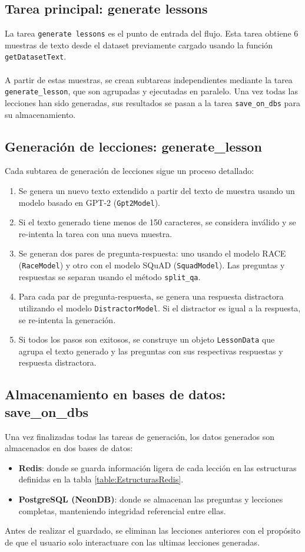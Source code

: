 \subsection{Tarea principal: generate lessons}
La tarea \texttt{generate lessons} es el punto de entrada del flujo. Esta tarea obtiene 6 muestras de texto desde el dataset previamente cargado usando la función \texttt{getDatasetText}.
\\
\\
A partir de estas muestras, se crean subtareas independientes mediante la tarea \texttt{generate\_lesson}, que son agrupadas y ejecutadas en paralelo. Una vez todas las lecciones han sido generadas, sus resultados se pasan a la tarea \texttt{save\_on\_dbs} para su almacenamiento.

\subsection{Generación de lecciones: generate\_lesson}
Cada subtarea de generación de lecciones sigue un proceso detallado:

\begin{enumerate}
\item Se genera un nuevo texto extendido a partir del texto de muestra usando un modelo basado en GPT-2 (\texttt{Gpt2Model}).
\item Si el texto generado tiene menos de 150 caracteres, se considera inválido y se re-intenta la tarea con una nueva muestra.
\item Se generan dos pares de pregunta-respuesta: uno usando el modelo RACE (\texttt{RaceModel}) y otro con el modelo SQuAD (\texttt{SquadModel}). Las preguntas y respuestas se separan usando el método \texttt{split\_qa}.
\item Para cada par de pregunta-respuesta, se genera una respuesta distractora utilizando el modelo \texttt{DistractorModel}. Si el distractor es igual a la respuesta, se re-intenta la generación.
\item Si todos los pasos son exitosos, se construye un objeto \texttt{LessonData} que agrupa el texto generado y las preguntas con sus respectivas respuestas y respuesta distractora.
\end{enumerate}

\subsection{Almacenamiento en bases de datos: save\_on\_dbs}
Una vez finalizadas todas las tareas de generación, los datos generados son almacenados en dos bases de datos:

\begin{itemize}
\item \textbf{Redis}: donde se guarda información ligera de cada lección en las estructuras definidas en la tabla \ref{table:EstructurasRedis}.
\item \textbf{PostgreSQL (NeonDB)}: donde se almacenan las preguntas y lecciones completas, manteniendo integridad referencial entre ellas.
\end{itemize}

Antes de realizar el guardado, se eliminan las lecciones anteriores con el propósito de que el usuario solo interactuare con las ultimas lecciones generadas.